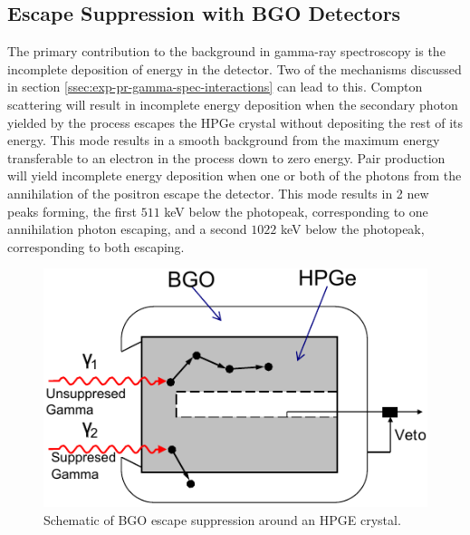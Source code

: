 \subsection{Escape Suppression with BGO Detectors}
\label{ssec:exp-pr-gamma-spec-escape-supress}
The primary contribution to the background in gamma-ray spectroscopy is the incomplete deposition of energy in the detector. Two of the mechanisms discussed in section \ref{ssec:exp-pr-gamma-spec-interactions} can lead to this. Compton scattering will result in incomplete energy deposition when the secondary photon yielded by the process escapes the HPGe crystal without depositing the rest of its energy. This mode results in a smooth background from the maximum energy transferable to an electron in the process down to zero energy. Pair production will yield incomplete energy deposition when one or both of the photons from the annihilation of the positron escape the detector. This mode results in 2 new peaks forming, the first $511$ keV below the photopeak, corresponding to one annihilation photon escaping, and a second $1022$ keV below the photopeak, corresponding to both escaping.
\begin{figure}[h!]
	\centerline{\includegraphics[height=0.25\textheight]{./img/c3/BGO_schematic.pdf}}
	\caption{Schematic of BGO escape suppression around an HPGE crystal.}
	\label{fig:chp3-supression-schematic}
\end{figure}

